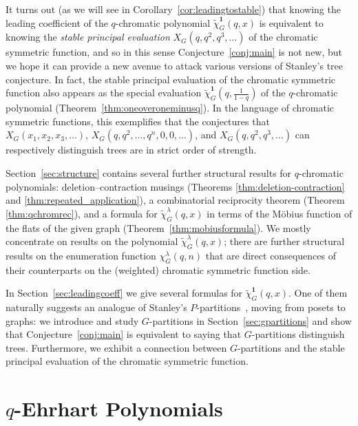 \documentclass[11pt]{amsart}
\newcommand\bone{\mathbf{1}}
\begin{document}
It turns out (as we will see in Corollary~\ref{cor:leadingtostable}) that knowing the leading coefficient of
the $q$-chromatic polynomial $\widetilde{\chi}_G^\bone(q,x)$ is equivalent to knowing the \emph{stable
principal evaluation} $X_G(q,q^2,q^3,\hdots)$ of the chromatic symmetric function, and so in this sense
Conjecture~\ref{conj:main} is not new, but we hope it can provide a new avenue to attack various versions of
Stanley's tree conjecture.
In fact, the stable principal evaluation of the chromatic symmetric function also appears as the special
evaluation $\widetilde{\chi}_G^\bone ( q, \frac{ 1 }{ 1-q })$ of the $q$-chromatic polynomial
(Theorem~\ref{thm:oneoveroneminusq}).
In the language of chromatic symmetric functions, this exemplifies that the conjectures that
$X_G(x_1,x_2,x_3,\hdots)$, 
$X_G(q,q^2,\hdots,q^n,0,0,\hdots)$, and
$X_G(q,q^2,q^3,\hdots)$
can respectively distinguish trees are in strict order of strength.

Section~\ref{sec:structure} contains several further structural results for $q$-chromatic polynomials: deletion--contraction musings (Theorems \ref{thm:deletion-contraction} and \ref{thm:repeated_application}), a combinatorial reciprocity theorem (Theorem \ref{thm:qchromrec}), and a formula for $\widetilde{\chi}_G^\lambda(q,x)$ in terms of the M\"obius function of the flats of the given graph (Theorem~\ref{thm:mobiusformula}).
We mostly concentrate on results on the polynomial $\widetilde{\chi}_G^\lambda(q,x)$; 
there are further structural results on the enumeration function $\chi_G^\lambda(q,n)$ that
are direct consequences of their counterparts on the (weighted) chromatic symmetric function
side.

In Section~\ref{sec:leadingcoeff} we give several formulas for $\widetilde{\chi}_G^\bone(q,x)$.
One of them naturally suggests an analogue of Stanley's $P$-partitions~\cite{stanleythesis}, moving from posets to graphs:  we introduce and study $G$-partitions in Section~\ref{sec:gpartitions} and show that Conjecture~\ref{conj:main} is equivalent to saying that $G$-partitions distinguish trees.
Furthermore, we exhibit a connection between $G$-partitions and the stable principal evaluation of the chromatic symmetric function.


\section{$q$-Ehrhart Polynomials}\label{sec:qehrhart}
\end{document}
